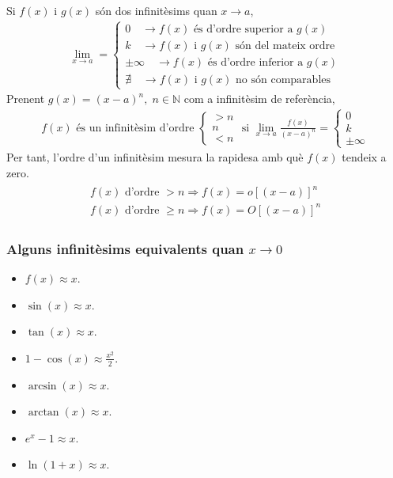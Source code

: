 Si $f(x)$ i $g(x)$ són dos infinitèsims quan $x \to a$, 
\begin{align}
    \lim\limits_{x \to a} = 
    \begin{cases} 
        0 \quad \rightarrow f(x) \text{ és d'ordre superior a } g(x) \\ 
        k \quad \rightarrow f(x) \text{ i } g(x) \text{ són del mateix ordre} \\ 
        \pm \infty \quad \rightarrow f(x) \text{ és d'ordre inferior a } g(x) \\ 
        \nexists \quad \rightarrow f(x) \text{ i } g(x) \text{ no són comparables}
    \end{cases}
\end{align}
Prenent $g(x) = (x-a)^{n}, \; n \in \mathbb{N}$ com a infinitèsim de referència, 
\begin{align}
    f(x) \text{ és un infinitèsim d'ordre }
        \begin{cases} 
            > n \\ 
            n \\ 
            < n 
        \end{cases} 
    \text{ si } \lim\limits_{x \to a} \frac{f(x)}{(x-a)^{n}} =  
        \begin{cases}
            0 \\
            k \\
            \pm \infty
        \end{cases}
\end{align}
Per tant, l'ordre d'un infinitèsim mesura la rapidesa amb què $f(x)$ tendeix a zero.
\begin{align}
\begin{gathered}
    f(x) \text{ d'ordre } >n \Rightarrow f(x) = o[(x-a)]^{n} \\
    f(x) \text{ d'ordre } \geq n \Rightarrow f(x) = O[(x-a)]^{n}
\end{gathered}
\end{align}

\subsubsection*{Alguns infinitèsims equivalents quan $x \to 0$}
\begin{itemize}
    \item $f(x) \approx x$.
    \item $\sin(x) \approx x$.
    \item $\tan(x) \approx x$.
    \item $1-\cos(x) \approx \frac {x^2}{2}$.
    \item $\arcsin(x) \approx x$.
    \item $\arctan (x) \approx x$.
    \item $e^{x}-1 \approx x$.
    \item $\ln(1+x) \approx x$.
\end{itemize}
